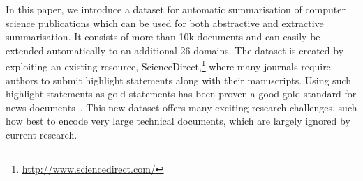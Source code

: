 \documentclass[11pt,a4paper]{article}
\begin{document}
In this paper, we introduce a dataset for automatic summarisation of computer science publications which can be used for both abstractive and extractive summarisation. It consists of more than 10k documents and can easily be extended automatically to an additional 26 domains. The dataset is created by exploiting an existing resource, ScienceDirect,\footnote{\url{http://www.sciencedirect.com/}} where many journals require authors to submit highlight statements along with their manuscripts. Using such highlight statements as gold statements has been proven a good gold standard for news documents~\cite{nallapati2016summarunner}.
This new dataset offers many exciting research challenges, such how best to encode very large technical documents, which are largely ignored by current research.

\setlength{\tabcolsep}{0.3em}
\end{document}

